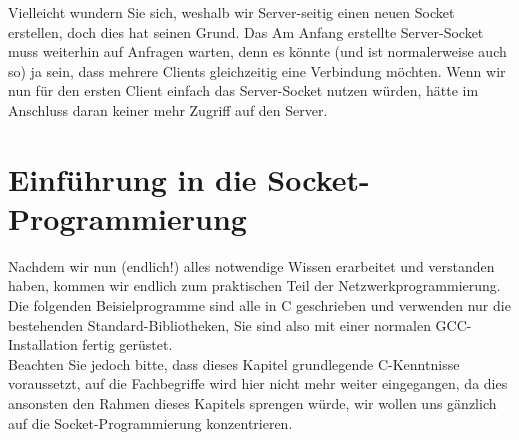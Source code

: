 \documentclass[b5paper,10pt,dvips,fleqn,titlepage,twoside]{book}
\begin{document}
Vielleicht wundern Sie sich, weshalb wir Server-seitig einen neuen Socket erstellen, doch dies hat seinen Grund. Das Am Anfang erstellte Server-Socket muss weiterhin auf Anfragen warten, denn es könnte (und ist normalerweise auch so) ja sein, dass mehrere Clients gleichzeitig eine Verbindung möchten. Wenn wir nun für den ersten Client einfach das Server-Socket nutzen würden, hätte im Anschluss daran keiner mehr Zugriff auf den Server.\\

\chapter{Einführung in die Socket-Programmierung}
Nachdem wir nun (endlich!) alles notwendige Wissen erarbeitet und verstanden haben, kommen wir endlich zum praktischen Teil der Netzwerkprogrammierung. Die folgenden Beisielprogramme sind alle in C geschrieben und verwenden nur die bestehenden Standard-Bibliotheken, Sie sind also mit einer normalen GCC-Installation fertig gerüstet.\\
Beachten Sie jedoch bitte, dass dieses Kapitel grundlegende C-Kenntnisse voraussetzt, auf die Fachbegriffe wird hier nicht mehr weiter eingegangen, da dies ansonsten den Rahmen dieses Kapitels sprengen würde, wir wollen uns gänzlich auf die Socket-Programmierung konzentrieren.
\end{document}
